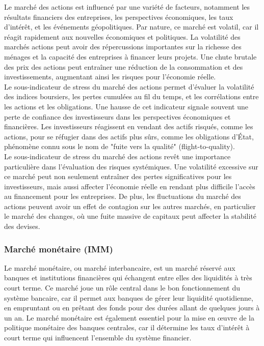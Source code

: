 \begin{sloppypar}
Le marché des actions est influencé par une variété de facteurs, notamment les résultats financiers des entreprises, les perspectives économiques, les taux d'intérêt, et les événements géopolitiques. Par nature, ce marché est volatil, car il réagit rapidement aux nouvelles économiques et politiques. La volatilité des marchés actions peut avoir des répercussions importantes sur la richesse des ménages et la capacité des entreprises à financer leurs projets. Une chute brutale des prix des actions peut entraîner une réduction de la consommation et des investissements, augmentant ainsi les risques pour l'économie réelle.\\

Le sous-indicateur de stress du marché des actions permet d’évaluer la volatilité des indices boursiers, les pertes cumulées au fil du temps, et les corrélations entre les actions et les obligations. Une hausse de cet indicateur signale souvent une perte de confiance des investisseurs dans les perspectives économiques et financières. Les investisseurs réagissent en vendant des actifs risqués, comme les actions, pour se réfugier dans des actifs plus sûrs, comme les obligations d'État, phénomène connu sous le nom de "fuite vers la qualité" (flight-to-quality).\\ 

Le sous-indicateur de stress du marché des actions revêt une importance particulière dans l'évaluation des risques systémiques. Une volatilité excessive sur ce marché peut non seulement entraîner des pertes significatives pour les investisseurs, mais aussi affecter l'économie réelle en rendant plus difficile l'accès au financement pour les entreprises. De plus, les fluctuations du marché des actions peuvent avoir un effet de contagion sur les autres marchés, en particulier le marché des changes, où une fuite massive de capitaux peut affecter la stabilité des devises.

\subsubsection{Marché monétaire (IMM)}

Le marché monétaire, ou marché interbancaire, est un marché réservé aux banques et institutions financières qui échangent entre elles des liquidités à très court terme. Ce marché joue un rôle central dans le bon fonctionnement du système bancaire, car il permet aux banques de gérer leur liquidité quotidienne, en empruntant ou en prêtant des fonds pour des durées allant de quelques jours à un an. Le marché monétaire est également essentiel pour la mise en œuvre de la politique monétaire des banques centrales, car il détermine les taux d'intérêt à court terme qui influencent l'ensemble du système financier.\\


\end{sloppypar}

